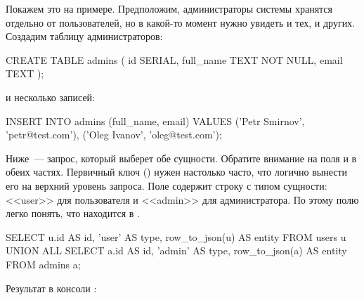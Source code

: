 Покажем это на примере. Предположим, администраторы системы хранятся отдельно от пользователей, но в какой-то момент нужно увидеть и тех, и других. Создадим таблицу администраторов:

\begin{english}
  \begin{sql}
CREATE TABLE admins (
  id SERIAL,
  full_name TEXT NOT NULL,
  email TEXT
);
  \end{sql}
\end{english}

\noindent
и несколько записей:

\begin{english}
  \begin{sql}
INSERT INTO admins (full_name, email)
VALUES ('Petr Smirnov', 'petr@test.com'),
       ('Oleg Ivanov', 'oleg@test.com');
  \end{sql}
\end{english}

Ниже~--- запрос, который выберет обе сущности. Обратите внимание на поля  и  в обеих частях. Первичный ключ () нужен настолько часто, что логично вынести его на верхний уровень запроса. Поле  содержит строку с типом сущности: <<user>> для пользователя и <<admin>> для администратора. По этому полю легко понять, что находится в .

\begin{english}
  \begin{sql}
SELECT
  u.id AS id,
  'user' AS type,
  row_to_json(u) AS entity
FROM
  users u
UNION ALL
SELECT
  a.id AS id,
  'admin' AS type,
  row_to_json(a) AS entity
FROM
  admins a;
  \end{sql}
\end{english}

Результат в консоли :



